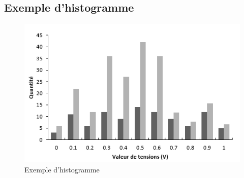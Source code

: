 \subsection{Exemple d'histogramme}
  \begin{figure}[H]
    \centering
    \includegraphics[scale=1]{Images/Histogram.png}
    \caption{Exemple d'histogramme}
    \label{fig:Histogram}
  \end{figure}
